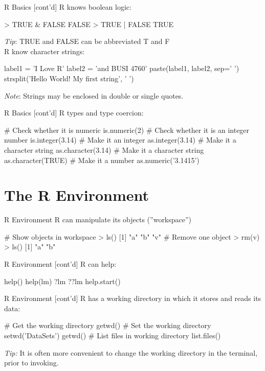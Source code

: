 \documentclass[ignorenonframetext,xcolor=x11names]{beamer}
\begin{document}
\begin{frame}[fragile]{R Basics \small [cont'd]}
R knows boolean logic:
\begin{Rcode}
> TRUE & FALSE
FALSE
> TRUE | FALSE
TRUE
\end{Rcode}

\emph{Tip}: TRUE and FALSE can be abbreviated T and F \\

R know character strings:
\begin{Rcode}
label1 = 'I Love R'
label2 = 'and BUSI 4760'
paste(label1, label2, sep=' ')
strsplit('Hello World! My first string', ' ')
\end{Rcode}
\emph{Note}: Strings may be enclosed in double or single quotes. \\

\end{frame}

\begin{frame}[fragile]{R Basics \small [cont'd]}
R types and type coercion:
\begin{Rcode}
# Check whether it is numeric
is.numeric(2)
# Check whether it is an integer number
is.integer(3.14)
# Make it an integer
as.integer(3.14)
# Make it a character string
as.character(3.14)
# Make it a character string
as.character(TRUE)
# Make it a number
as.numeric('3.1415')
\end{Rcode}
\end{frame}

\section{The R Environment}

\begin{frame}[fragile]{R Environment}
R can manipulate its objects (''workspace'')
\begin{Rcode}
# Show objects in workspace
> ls()
[1] "a"          "b"          "v"
# Remove one object
> rm(v)
> ls()
[1] "a"          "b"
\end{Rcode}
\end{frame}


\begin{frame}[fragile]{R Environment \small [cont'd]}
R can help:
\begin{Rcode}
help()
help(lm)
?lm
??lm
help.start()
\end{Rcode}
\end{frame}

\begin{frame}[fragile]{R Environment \small [cont'd]}
R has a working directory in which it stores and reads its data:
\begin{Rcode}
# Get the working directory
getwd()
# Set the working directory
setwd('DataSets')
getwd()
# List files in working directory
list.files()
\end{Rcode}

\emph{Tip:} It is often more convenient to change the working directory in the terminal, prior to invoking.

\end{frame}
\end{document}
